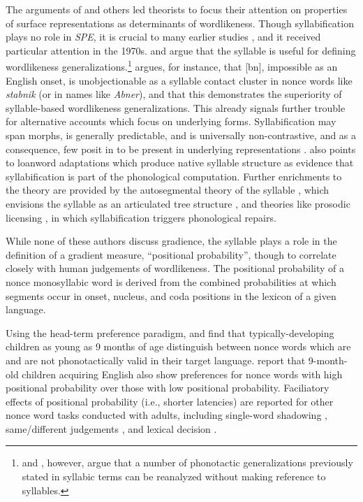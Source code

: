 The arguments of \citeauthor{Shibatani1973} and others led theorists to focus their attention on properties of surface representations as determinants of wordlikeness. Though syllabification plays no role in \emph{SPE}, it is crucial to many earlier studies \citep[for a review, see][]{Goldsmith2011b}, and it received particular attention in the 1970s. \citet{Hooper1973} and \citet{Kahn1976} argue that the syllable is useful for defining wordlikeness generalizations.\footnote{\citet{Steriade1999} and \citet{Blevins2003}, however, argue that a number of phonotactic generalizations previously stated in syllabic terms can be reanalyzed without making reference to syllables.} \citeauthor{Hooper1973} argues, for instance, that [bn], impossible as an English onset, is unobjectionable as a syllable contact cluster in nonce words like \emph{stabnik} (or in names like \emph{Abner}), and that this demonstrates the superiority of syllable-based wordlikeness generalizations. This already signals further trouble for alternative accounts which focus on underlying forms. Syllabification may span morphs, is generally predictable, and is universally non-contrastive, and as a consequence, few posit in to be present in underlying representations \citep[though see, e.g.,][]{Vaux2003}. \citeauthor{Hooper1973} also points to loanword adaptations which produce native syllable structure \citep[e.g.,][]{Carlisle1991} as evidence that syllabification is part of the phonological computation. Further enrichments to the theory are provided by the autosegmental theory of the syllable \citep{McCarthy1979b}, which envisions the syllable as an articulated tree structure \citep[as first envisioned by][]{Pike1947a}, and theories like prosodic licensing \citep{Ito1989a}, in which syllabification triggers phonological repairs.

While none of these authors discuss gradience, the syllable plays a role in the definition of a gradient measure, ``positional probability'', though to correlate closely with human judgements of wordlikeness. The positional probability of a nonce monosyllabic word is derived from the combined probabilities at which segments occur in onset, nucleus, and coda positions in the lexicon of a given language. 

Using the head-term preference paradigm, \citet{Jusczyk1993b} and \citet{Friederici1993} find that typically-developing children as young as 9 months of age distinguish between nonce words which are and are not phonotactically valid in their target language. \citet{Jusczyk1994} report that 9-month-old children acquiring English also show preferences for nonce words with high positional probability over those with low positional probability. Faciliatory effects of positional probability (i.e., shorter latencies) are reported for other nonce word tasks conducted with adults, including single-word shadowing \citep{Vitevitch1997,Vitevitch1998}, same/different judgements \citep{Vitevitch1999a,Luce2001,Lipinski2005,Vitevitch2005}, and lexical decision \citep{Pylkkanen2002a}.

